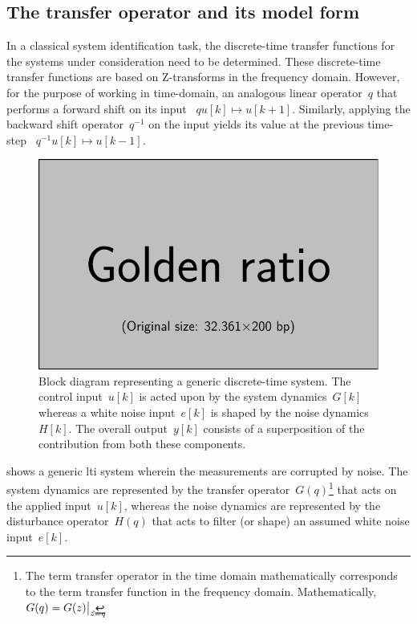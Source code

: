 
\subsection{The transfer operator and its model form}
In a classical system identification  task, the discrete-time transfer functions
for the systems  under consideration need to be  determined. These discrete-time
transfer functions are  based on Z-transforms in the  frequency domain. However,
for the purpose of working in time-domain, an analogous linear operator~$q$ that
performs a  forward shift on  its input \ie~$  {q u[k] \longmapsto  u[k+1]} $.
Similarly, applying the  backward shift operator~$ q^{-1} $  on the input yields
its value at the previous time-step \ie~$ {q^{-1} u[k] \longmapsto u[k-1]}$.

\begin{figure}[!htbp]
    \centering
    \includegraphics{placeholder_images/example-image-golden.pdf}
    \caption[Block diagram representing a generic discrete-time  system]{%
        Block  diagram representing  a  generic discrete-time  
        system. The  control input~$u[k]$ is  acted upon by the  system dynamics~$G[k]$  whereas a  white  noise  input~$e[k]$  is  shaped  by the  noise
        dynamics~$H[k]$. The  overall output~$y[k]$ consists  of a superposition
        of the contribution from both these components.
    }%
    \label{fig:genericltisyswithnoise}
\end{figure}

 shows  a generic \gls{lti} system  wherein the
measurements are corrupted by noise. The  system dynamics are represented by the
transfer operator~$G(q)$\footnote{The term transfer  operator in the time domain
mathematically  corresponds  to the  term  transfer  function in  the  frequency
domain.  Mathematically,~${G(q) =  G(z)\bigr\rvert_{\mathrlap{z=q}}}$.}  that  acts on  the
applied  input~$u[k]$,  whereas  the  noise dynamics  are  represented  by  the
disturbance operator~$H(q)$ that  acts to  filter (or  shape) an  assumed white
noise input~$e[k]$.

